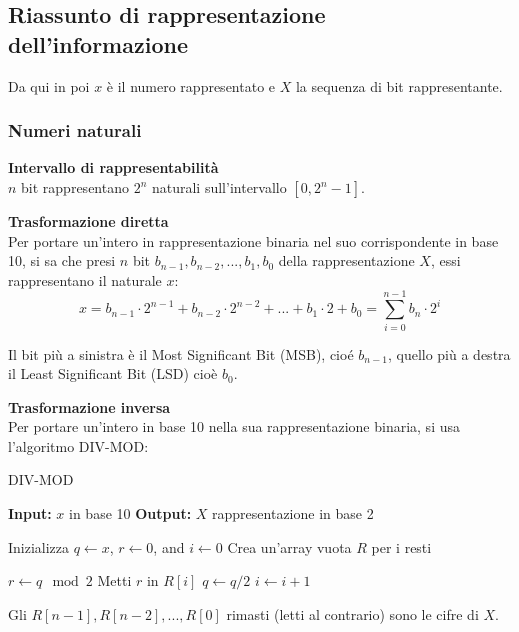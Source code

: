 \documentclass[a4paper,11pt]{article}
\begin{document}
\subsection{Riassunto di rappresentazione dell'informazione}

Da qui in poi $x$ è il numero rappresentato e $X$ la sequenza di bit rappresentante.

\subsubsection{Numeri naturali}

\textbf{\textsf{Intervallo di rappresentabilità}} \\
$n$ bit rappresentano $2^n$ naturali sull'intervallo $[0, 2^n- 1]$.

\par\medskip
\noindent
\textbf{\textsf{Trasformazione diretta}} \\
Per portare un'intero in rappresentazione binaria nel suo corrispondente in base 10, si sa che presi $n$ bit $b_{n-1}, b_{n-2}, ... , b_1, b_0$ della rappresentazione $X$, essi rappresentano il naturale $x$:
$$
x =  b_{n-1} \cdot 2^{n-1} + b_{n-2} \cdot 2^{n-2} + ... + b_1 \cdot 2 + b_0 = \sum_{i=0}^{n-1} b_n \cdot 2^i
$$

Il bit più a sinistra è il Most Significant Bit (MSB), cioé $b_{n-1}$, quello più a destra il Least Significant Bit (LSD) cioè $b_0$.

\par\medskip
\noindent
\textbf{\textsf{Trasformazione inversa}} \\
Per portare un'intero in base 10 nella sua rappresentazione binaria, si usa l'algoritmo DIV-MOD:

\begin{algorithm}
\caption{DIV-MOD}
\begin{algorithmic} %
    \STATE \textbf{Input:} $x$ in base 10
    \STATE \textbf{Output:} $X$ rappresentazione in base 2
    
    \STATE Inizializza $q \gets x$, $r \gets 0$, and $i \gets 0$ %
    \STATE Crea un'array vuota $R$ per i resti 

        \STATE $r \gets q \mod 2$ %
        \STATE Metti $r$ in $R[i]$ %
        \STATE $q \gets q / 2$ %
        \STATE $i \gets i + 1$ %
    \ENDWHILE
    
    \STATE Gli $R[n-1], R[n-2], ..., R[0]$ rimasti (letti al contrario) sono le cifre di $X$.
\end{algorithmic}
\end{algorithm}
\end{document}
